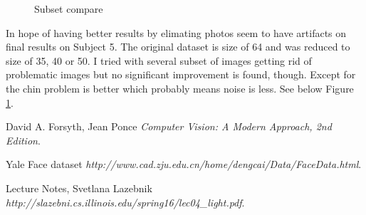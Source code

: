 \documentclass[a4paper]{article}
\begin{document}
\begin{figure}[h!]
\centering
{}
\caption{Subset compare\label{fig:sub}}
\end{figure}

In hope of having better results by elimating photos seem to have artifacts on final results on Subject 5. The original dataset is size of 64 and was reduced to size of 35, 40 or 50. I tried with several subset of images getting rid of problematic images but no significant improvement is found, though. Except for the chin problem is better which probably means noise is less. See below Figure \ref{fig:sub}.

\begin{thebibliography}{12}
 David A. Forsyth, Jean Ponce 
  \emph{Computer Vision: A Modern Approach, 2nd Edition}.
  
Yale Face dataset
  \emph{http://www.cad.zju.edu.cn/home/dengcai/Data/FaceData.html}.

Lecture Notes, Svetlana Lazebnik
	\emph{http://slazebni.cs.illinois.edu/spring16/lec04\_light.pdf}.
    
\end{thebibliography}
\end{document}
